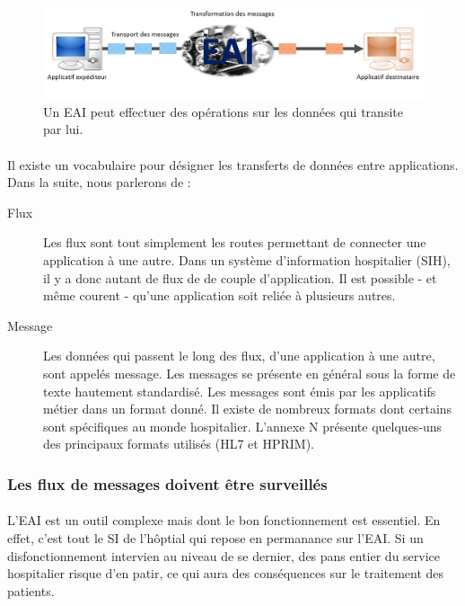 			\begin{figure}
				\centering
				\includegraphics[width=15cm]{../img/eai_2.png}
				\caption{\label{Figure 2} Un EAI peut effectuer des opérations sur les
				données qui transite par lui.}
			\end{figure}
			
			\paragraph{}%
 			Il existe un vocabulaire pour désigner les transferts de données entre
 			applications. Dans la suite, nous parlerons de :
 			\begin{description}
 				\item[Flux] Les flux sont tout simplement les routes permettant de
 				connecter une application à une autre. Dans un système d'information hospitalier
 				(SIH), il y a donc autant de flux de de couple d'application. Il est
 				possible - et même courent - qu'une application soit reliée à plusieurs
 				autres.
 				\item[Message] Les données qui passent le long des flux, d'une application
 				à une autre, sont appelés message. Les messages se présente en général sous
 				la forme de texte hautement standardisé. Les messages sont émis par les
 				applicatifs métier dans un format donné. Il existe de nombreux formats
 				dont certains sont spécifiques au monde hospitalier. L'annexe N présente
 				quelques-uns des principaux formats utilisés (HL7 et HPRIM).
 			\end{description}
 			
		\subsubsection{Les flux de messages doivent être surveillés}
			\paragraph{}%
			L'EAI est un outil complexe mais dont le bon fonctionnement est essentiel. En
			effet, c'est tout le SI de l'hôptial qui repose en permanance sur l'EAI. Si
			un disfonctionnement intervien au niveau de se dernier, des pans entier du
			service hospitalier risque d'en patir, ce qui aura des conséquences sur le
			traitement des patients.
			

